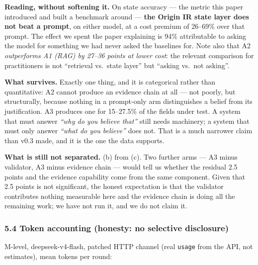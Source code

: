 \documentclass[
  english,
]{article}
\begin{document}
\textbf{Reading, without softening it.} On state accuracy --- the metric
this paper introduced and built a benchmark around --- \textbf{the
Origin IR state layer does not beat a prompt}, on either model, at a
cost premium of 26--69\% over that prompt. The effect we spent the paper
explaining is 94\% attributable to asking the model for something we had
never asked the baselines for. Note also that A2 \emph{outperforms A1
(RAG) by 27--36 points at lower cost}: the relevant comparison for
practitioners is not ``retrieval vs.~state layer'' but ``asking vs.~not
asking''.

\textbf{What survives.} Exactly one thing, and it is categorical rather
than quantitative: A2 cannot produce an evidence chain at all --- not
poorly, but structurally, because nothing in a prompt-only arm
distinguishes a belief from its justification. A3 produces one for
15--27.5\% of the fields under test. A system that must answer
\emph{``why do you believe that''} still needs machinery; a system that
must only answer \emph{``what do you believe''} does not. That is a much
narrower claim than v0.3 made, and it is the one the data supports.

\textbf{What is still not separated.} (b) from (c). Two further arms ---
A3 minus validator, A3 minus evidence chain --- would tell us whether
the residual 2.5 points and the evidence capability come from the same
component. Given that 2.5 points is not significant, the honest
expectation is that the validator contributes nothing measurable here
and the evidence chain is doing all the remaining work; we have not run
it, and we do not claim it.

\subsubsection{5.4 Token accounting (honesty: no selective
disclosure)}\label{token-accounting-honesty-no-selective-disclosure}

M-level, deepseek-v4-flash, patched HTTP channel (real \texttt{usage}
from the API, not estimates), mean tokens per round:
\end{document}
